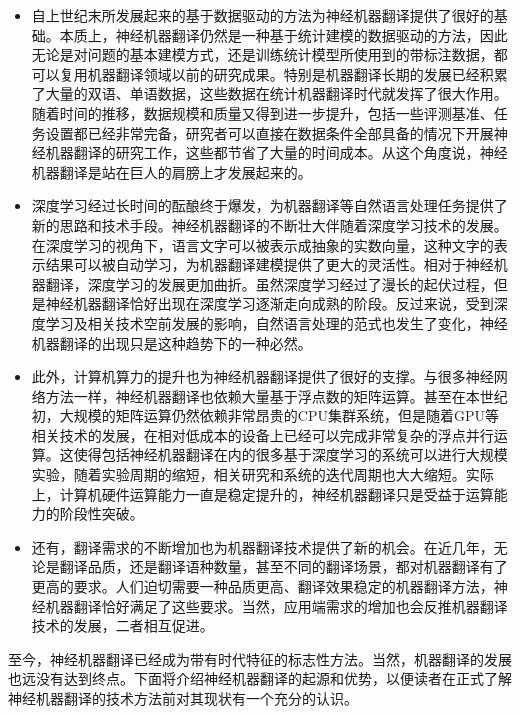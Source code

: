 \begin{itemize}
\vspace{0.5em}
\item 自上世纪末所发展起来的基于数据驱动的方法为神经机器翻译提供了很好的基础。本质上，神经机器翻译仍然是一种基于统计建模的数据驱动的方法，因此无论是对问题的基本建模方式，还是训练统计模型所使用到的带标注数据，都可以复用机器翻译领域以前的研究成果。特别是机器翻译长期的发展已经积累了大量的双语、单语数据，这些数据在统计机器翻译时代就发挥了很大作用。随着时间的推移，数据规模和质量又得到进一步提升，包括一些评测基准、任务设置都已经非常完备，研究者可以直接在数据条件全部具备的情况下开展神经机器翻译的研究工作，这些都节省了大量的时间成本。从这个角度说，神经机器翻译是站在巨人的肩膀上才发展起来的。
\vspace{0.5em}
\item 深度学习经过长时间的酝酿终于爆发，为机器翻译等自然语言处理任务提供了新的思路和技术手段。神经机器翻译的不断壮大伴随着深度学习技术的发展。在深度学习的视角下，语言文字可以被表示成抽象的实数向量，这种文字的表示结果可以被自动学习，为机器翻译建模提供了更大的灵活性。相对于神经机器翻译，深度学习的发展更加曲折。虽然深度学习经过了漫长的起伏过程，但是神经机器翻译恰好出现在深度学习逐渐走向成熟的阶段。反过来说，受到深度学习及相关技术空前发展的影响，自然语言处理的范式也发生了变化，神经机器翻译的出现只是这种趋势下的一种必然。
\vspace{0.5em}
\item 此外，计算机算力的提升也为神经机器翻译提供了很好的支撑。与很多神经网络方法一样，神经机器翻译也依赖大量基于浮点数的矩阵运算。甚至在本世纪初，大规模的矩阵运算仍然依赖非常昂贵的CPU集群系统，但是随着GPU等相关技术的发展，在相对低成本的设备上已经可以完成非常复杂的浮点并行运算。这使得包括神经机器翻译在内的很多基于深度学习的系统可以进行大规模实验，随着实验周期的缩短，相关研究和系统的迭代周期也大大缩短。实际上，计算机硬件运算能力一直是稳定提升的，神经机器翻译只是受益于运算能力的阶段性突破。
\vspace{0.5em}
\item 还有，翻译需求的不断增加也为机器翻译技术提供了新的机会。在近几年，无论是翻译品质，还是翻译语种数量，甚至不同的翻译场景，都对机器翻译有了更高的要求。人们迫切需要一种品质更高、翻译效果稳定的机器翻译方法，神经机器翻译恰好满足了这些要求。当然，应用端需求的增加也会反推机器翻译技术的发展，二者相互促进。
\vspace{0.5em}
\end{itemize}

\parinterval 至今，神经机器翻译已经成为带有时代特征的标志性方法。当然，机器翻译的发展也远没有达到终点。下面将介绍神经机器翻译的起源和优势，以便读者在正式了解神经机器翻译的技术方法前对其现状有一个充分的认识。

